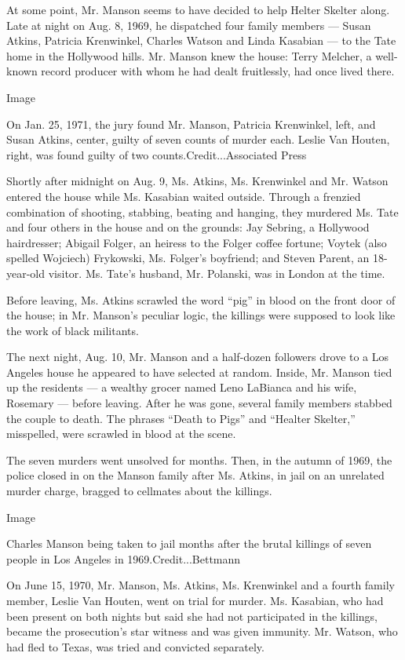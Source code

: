 At some point, Mr. Manson seems to have decided to help Helter Skelter
along. Late at night on Aug. 8, 1969, he dispatched four family members
--- Susan Atkins, Patricia Krenwinkel, Charles Watson and Linda Kasabian
--- to the Tate home in the Hollywood hills. Mr. Manson knew the house:
Terry Melcher, a well-known record producer with whom he had dealt
fruitlessly, had once lived there.

Image

On Jan. 25, 1971, the jury found Mr. Manson, Patricia Krenwinkel, left,
and Susan Atkins, center, guilty of seven counts of murder each. Leslie
Van Houten, right, was found guilty of two counts.Credit...Associated
Press

Shortly after midnight on Aug. 9, Ms. Atkins, Ms. Krenwinkel and Mr.
Watson entered the house while Ms. Kasabian waited outside. Through a
frenzied combination of shooting, stabbing, beating and hanging, they
murdered Ms. Tate and four others in the house and on the grounds: Jay
Sebring, a Hollywood hairdresser; Abigail Folger, an heiress to the
Folger coffee fortune; Voytek (also spelled Wojciech) Frykowski, Ms.
Folger's boyfriend; and Steven Parent, an 18-year-old visitor. Ms.
Tate's husband, Mr. Polanski, was in London at the time.

Before leaving, Ms. Atkins scrawled the word ``pig'' in blood on the
front door of the house; in Mr. Manson's peculiar logic, the killings
were supposed to look like the work of black militants.

The next night, Aug. 10, Mr. Manson and a half-dozen followers drove to
a Los Angeles house he appeared to have selected at random. Inside, Mr.
Manson tied up the residents --- a wealthy grocer named Leno LaBianca
and his wife, Rosemary --- before leaving. After he was gone, several
family members stabbed the couple to death. The phrases ``Death to
Pigs'' and ``Healter Skelter,'' misspelled, were scrawled in blood at
the scene.

The seven murders went unsolved for months. Then, in the autumn of 1969,
the police closed in on the Manson family after Ms. Atkins, in jail on
an unrelated murder charge, bragged to cellmates about the killings.

Image

Charles Manson being taken to jail months after the brutal killings of
seven people in Los Angeles in 1969.Credit...Bettmann

On June 15, 1970, Mr. Manson, Ms. Atkins, Ms. Krenwinkel and a fourth
family member, Leslie Van Houten, went on trial for murder. Ms.
Kasabian, who had been present on both nights but said she had not
participated in the killings, became the prosecution's star witness and
was given immunity. Mr. Watson, who had fled to Texas, was tried and
convicted separately.

